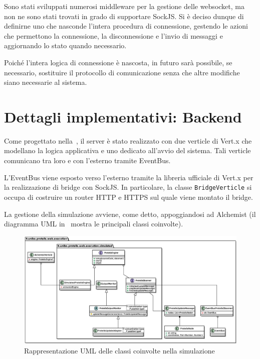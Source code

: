     Sono stati sviluppati numerosi middleware per la gestione delle websocket, ma non ne sono stati trovati in grado di supportare SockJS\@.
    Si è deciso dunque di definirne uno che nasconde l'intera procedura di connessione, gestendo le azioni che permettono la connessione, la disconnessione e l'invio di messaggi e aggiornando lo stato quando necessario.

    Poiché l'intera logica di connessione è nascosta, in futuro sarà possibile, se necessario, sostituire il protocollo di comunicazione senza che altre modifiche siano necessarie al sistema.


  \section{Dettagli implementativi: Backend}

    Come progettato nella~, il server è stato realizzato con due verticle di Vert.x che modellano la logica applicativa e uno dedicato all'avvio del sistema.
    Tali verticle comunicano tra loro e con l'esterno tramite EventBus.

    L'EventBus viene esposto verso l'esterno tramite la libreria ufficiale di Vert.x per la realizzazione di bridge con SockJS\@.
    In particolare, la classe \texttt{BridgeVerticle} si occupa di costruire un router HTTP e HTTPS sul quale viene montato il bridge.

    La gestione della simulazione avviene, come detto, appoggiandosi ad Alchemist (il diagramma UML in~ mostra le principali classi coinvolte).

    \begin{figure}[htbp]
      \centering
      \includegraphics[width=\textwidth]{res/uml/engine-simple.eps}
      \caption{Rappresentazione UML delle classi coinvolte nella simulazione}%
      \label{fig:server:uml}
    \end{figure}

